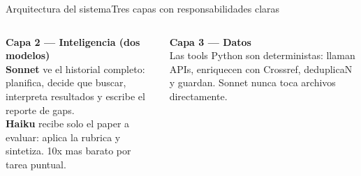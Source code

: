 \documentclass[aspectratio=169,10pt]{beamer}
\newenvironment{card}[1][cardbg]{%
  \begin{tcolorbox}[colback=#1,colframe=bidlight!40,arc=4pt,
    boxrule=0.4pt,left=5pt,right=5pt,top=4pt,bottom=4pt]}%
  {\end{tcolorbox}}
\begin{document}
\begin{frame}{Arquitectura del sistema}{Tres capas con responsabilidades claras}
\begin{columns}[T]
\begin{card}
\scriptsize\color{bidgray}
\textbf{\color{bidaccent}Capa 2 — Inteligencia (dos modelos)}\\[3pt]
\textbf{Sonnet} ve el historial completo: planifica, decide que buscar, interpreta resultados y escribe el reporte de gaps.\\[3pt]
\textbf{Haiku} recibe solo el paper a evaluar: aplica la rubrica y sintetiza. 10x mas barato por tarea puntual.
\end{card}\vspace{4pt}

\begin{card}
\scriptsize\color{bidgray}
\textbf{\color{bidaccent}Capa 3 — Datos}\\[3pt]
Las tools Python son deterministas: llaman APIs, enriquecen con Crossref, deduplicaN y guardan. Sonnet nunca toca archivos directamente.
\end{card}
\end{columns}
\end{frame}
\end{document}
